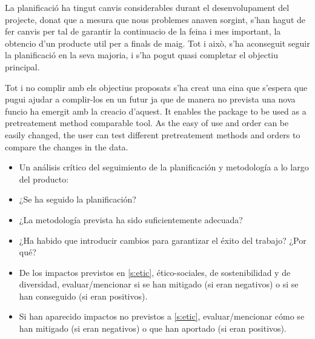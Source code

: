 \documentclass[ENG, BIB]{TFUOC}%
\begin{document}
La planificació ha tingut canvis considerables durant el desenvolupament del projecte, donat que a mesura que nous problemes anaven sorgint, s'han hagut de fer canvis per tal de garantir la continuacio de la feina i mes important, la obtencio d'un producte util per a finals de maig. Tot i això, s'ha aconseguit seguir la planificació en la seva majoria, i s'ha pogut quasi completar el objectiu principal.

Tot i no complir amb els objectius proposats s'ha creat una eina que s'espera que pugui ajudar a complir-los en un futur ja que de manera no prevista una nova funcio ha emergit amb la creacio d'aquest. It enables the package to be used as a pretreatement method comparable tool. As the easy of use and order can be easily changed, the user can test different pretreatement methods and orders to compare the changes in the data.

\begin{itemize}
    \item Un análisis crítico del seguimiento de la planificación y metodología a lo largo del producto:
    \item ¿Se ha seguido la planificación?
    \item ¿La metodología prevista ha sido suficientemente adecuada?
    \item ¿Ha habido que introducir cambios para garantizar el éxito del trabajo? ¿Por qué?
    \item De los impactos previstos en \ref{s:etic}, ético-sociales, de sostenibilidad y de diversidad, evaluar/mencionar si se han mitigado (si eran negativos) o si se han conseguido (si eran positivos).
    \item Si han aparecido impactos no previstos a \ref{s:etic}, evaluar/mencionar cómo se han mitigado (si eran negativos) o que han aportado (si eran positivos).
\end{itemize}




\printglossary[title=Glossary, toctitle=Glossary]
\printglossary[type=\acronymtype, title=Acronyms, toctitle=Acronyms]



\printbibliography[heading=bibintoc]


\newpage
\appendix
\end{document}
